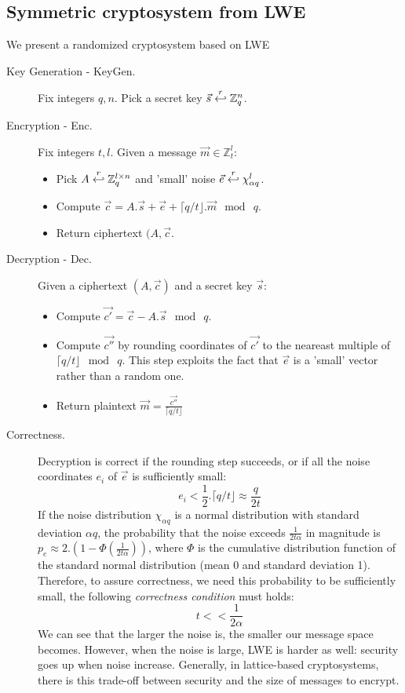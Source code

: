 \subsection{Symmetric cryptosystem from LWE}
\label{sec:LWESymmetric}
We present a randomized cryptosystem based on LWE
\begin{description}
\item[Key Generation - KeyGen.] Fix integers $q, n$. Pick a secret key
  $\vec{s} \stackrel{r}{\hookleftarrow} \mathbb{Z}_q^n$.
\item [Encryption - Enc.] Fix integers $t,l$. Given a message
  $\vec{m} \in \mathbb{Z}_t^l$:
  \begin{itemize}
  \item Pick $A \stackrel{r}{\hookleftarrow} \mathbb{Z}_q^{l \times n}$ and 'small' noise
    $\vec{e} \stackrel{r}{\hookleftarrow} \chi_{\alpha q}^l$.
  \item Compute
    $\vec{c} = A.\vec{s} + \vec{e} + \lceil q/t \rfloor . \vec{m} \mod \ q$.
  \item Return ciphertext $(A, \vec{c}$.
  \end{itemize}
\item [Decryption - Dec.] Given a ciphertext $(A,\vec{c})$ and a secret key
  $\vec{s}$:
  \begin{itemize}
  \item Compute $\vec{c'} = \vec{c} - A.\vec{s} \mod \ q$.
  \item Compute $\vec{c''}$ by rounding coordinates of $\vec{c'}$ to the
    neareast multiple of $\lceil q/t \rfloor \mod \ q$. This step exploits the
    fact that $\vec{e}$ is a 'small' vector rather than a random one.
  \item Return plaintext $\vec{m} = \frac{\vec{c''}}{\lceil q/t \rfloor}$
  \end{itemize}

\item [Correctness.] Decryption is correct if the rounding step succeeds, or if
  all the noise coordinates $e_i$ of $\vec{e}$ is sufficiently small:
  \[
    e_i < \frac{1}{2} . \lceil q/t \rfloor \approx \frac{q}{2t}
  \]
  If the noise distribution $\chi_{\alpha q}$ is a normal distribution with
  standard deviation $\alpha q$, the probability that the noise exceeds
  $\frac{1}{2t\alpha}$ in magnitude is
  $p_e \approx 2.\left( 1 - \Phi\left( \frac{1}{2t\alpha} \right) \right)$,
  where $\Phi$ is the cumulative distribution function of the standard normal
  distribution (mean 0 and standard deviation 1). Therefore, to assure
  correctness, we need this probability to be sufficiently small, the following
  \emph{correctness condition} must holds:
  \[
    t << \frac{1}{2\alpha}
  \]
  We can see that the larger the noise is, the smaller our message space
  becomes. However, when the noise is large, LWE is harder as well: security
  goes up when noise increase.  Generally, in lattice-based cryptosystems, there
  is this trade-off between security and the size of messages to encrypt.


\end{description}

